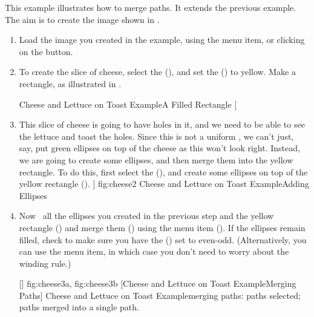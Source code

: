 This example illustrates how to merge paths. It extends the
previous  example.
The aim is to create the image shown in .

\begin{enumerate}
\item Load the image you created in the
 example, using the
 menu item, or clicking on the 
button.

\item To create the slice of cheese, select the
 (), and set the
 () to yellow.
Make a rectangle, as illustrated in .

{}
{Cheese and Lettuce on Toast Example\dash A Filled Rectangle}
[
  \item This slice of cheese is going to have holes in it, and we need
  to be able to see the lettuce and toast  the holes. Since
  this is not a uniform , we can't just, say, put green ellipses
  on top of the cheese as this won't look right. Instead, we are going
  to create some ellipses, and then merge them into the yellow rectangle.
  To do this, first select the
   (), and create some
  ellipses on top of the yellow rectangle ().
]
{fig:cheese2}
{}
{Cheese and Lettuce on Toast Example\dash Adding Ellipses}

\item Now \select\ all the ellipses
you created in the previous step and the yellow rectangle
() and 
merge them () using the
 menu item ().
If the ellipses remain filled, check to make sure you have the
 () set to even-odd.
(Alternatively, you can use the 
menu item, in which case you don't need to worry about the winding
rule.)

[]
{
  {fig:cheese3a}{}{},
  {fig:cheese3b}{}{}
}
[Cheese and Lettuce on Toast Example\dash Merging Paths]
{Cheese and Lettuce on Toast Example\dash merging paths:
 paths selected;
 paths merged into a single
path.}

\end{enumerate}

